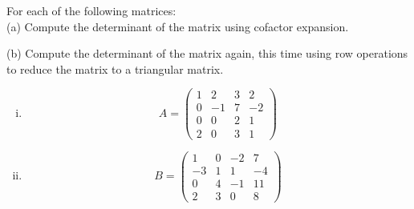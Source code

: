 \begin{question}

\normalfont
For each of the following matrices: \\

\noindent (a) Compute the determinant of the matrix using cofactor expansion. 

\noindent (b) Compute the determinant of the matrix again, this time using row operations to reduce the matrix to a triangular matrix. \\

\begin{enumerate}[(i)]
\item
\[
A= \begin{pmatrix}
			1 & 2 & 3 & 2\\
			0 & -1 & 7 & -2\\
			0 & 0 & 2 & 1\\
			2 & 0 & 3 & 1	
		\end{pmatrix}
\]
\item
\[
B= \begin{pmatrix}
			1 & 0 & -2 & 7\\
			-3 & 1 & 1 & -4\\
			0 & 4 & -1 & 11\\
			2 & 3 & 0 & 8	
		\end{pmatrix}
\]

\end{enumerate}
\end{question}